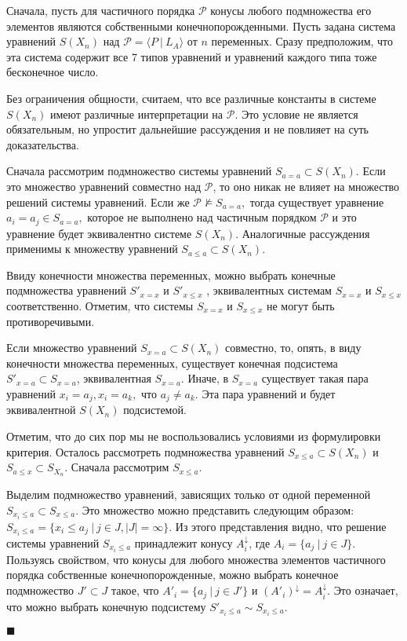 \documentclass[12pt]{article}
\theoremstyle{break}
\newenvironment{Proof} %
	{\par\noindent{\bf Доказательство.}} %
	{\hfill$\scriptstyle\blacksquare$} %
\def\P{\mathcal{P}}
\begin{document}
		\begin{Proof}
			Сначала, пусть для частичного порядка $\P$ конусы любого подмножества его элементов являются собственными конечнопорожденными. Пусть задана система уравнений $S(X_n)$ над $\P = \langle P~|~L_A\rangle$ от $n$ переменных. Сразу предположим, что эта система содержит все 7 типов уравнений и уравнений каждого типа тоже бесконечное число.

			Без ограничения общности, считаем, что все различные константы в системе $S(X_n)$ имеют различные интерпретации на $\P$. Это условие не является обязательным, но упростит дальнейшие рассуждения и не повлияет на суть доказательства.

			Сначала рассмотрим подмножество системы уравнений $S_{a=a}\subset S(X_n)$. Если это множество уравнений совместно над $\P$, то оно никак не влияет на множество решений системы уравнений. Если же $\P\nvDash S_{a=a},$ тогда существует уравнение $a_i=a_j\in S_{a=a},$ которое не выполнено над частичным порядком $\P$ и это уравнение будет эквивалентно системе $S(X_n).$ Аналогичные рассуждения применимы к множеству уравнений $S_{a\leqslant a}\subset S(X_n).$

			Ввиду конечности множества переменных, можно выбрать конечные подмножества уравнений $S'_{x=x}$ и $S'_{x\leqslant x}$ , эквивалентных системам $S_{x=x}$ и $S_{x\leqslant x}$ соответственно. Отметим, что системы $S_{x=x}$ и $S_{x\leqslant x}$ не могут быть противоречивыми.

			Если множество уравнений $S_{x=a}\subset S(X_n)$ совместно, то, опять, в виду конечности множества переменных, существует конечная подсистема $S'_{x=a}\subset S_{x=a}$, эквивалентная $S_{x=a}.$ Иначе, в $S_{x=a}$  существует такая пара уравнений $x_i=a_j, x_i=a_k,$ что $a_j\neq a_k$. Эта пара уравнений и будет эквивалентной $S(X_n)$ подсистемой.

			Отметим, что до сих пор мы не воспользовались условиями из формулировки критерия. Осталось рассмотреть подмножества уравнений $S_{x\leqslant a}\subset S(X_n)$ и $S_{a\leqslant x}\subset S_{X_n}$. Сначала рассмотрим $S_{x\leqslant a}$.

			Выделим подмножество уравнений, зависящих только от одной переменной $S_{x_i\leqslant a}\subset S_{x\leqslant a}$. Это множество можно представить следующим образом: $S_{x_i\leqslant a}=\{x_i\leqslant a_j\ |\ j\in J, |J| = \infty\}.$ Из этого представления видно, что решение системы уравнений $S_{x_i\leqslant a}$ принадлежит конусу $A_i^{\downarrow}$, где $A_i = \{a_j\ |\ j\in J\}$. Пользуясь свойством, что конусы для любого множества элементов частичного порядка собственные конечнопорожденные, можно выбрать конечное подмножество $J'\subset J$ такое, что $A'_i = \{a_j\ |\ j\in J'\}$ и $(A'_i)^{\downarrow} = A_i^{\downarrow}.$ Это означает, что можно выбрать конечную подсистему $S'_{x_i\leqslant a}\sim S_{x_i\leqslant a}$.


\end{Proof}
\end{document}
